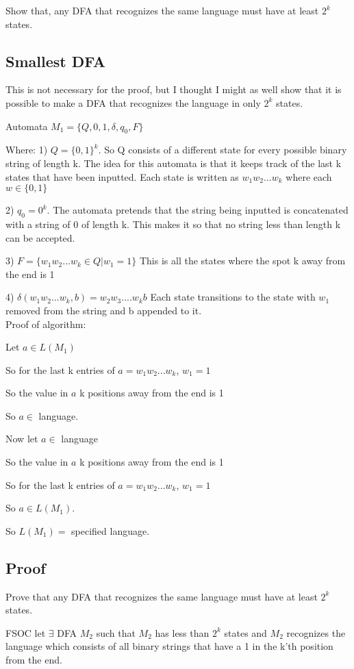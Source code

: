 \documentclass[letterpaper, 11pt]{article}
\begin{document}
Show that, any DFA that recognizes the same language must have at least $2^k$ states.
\subsection*{Smallest DFA}
This is not necessary for the proof, but I thought I might as well show that it is possible to make a DFA that recognizes the language in only $2^k$ states.

Automata $M_1 = \{Q, {0,1}, \delta, q_0, F\}$

Where:
1) $Q = \{0, 1\}^k$. So Q consists of a different state for every possible binary string of length k.
The idea for this automata is that it keeps track of the last k states that have been inputted.
Each state is written as $w_1w_2...w_k$ where each $w \in \{0, 1\}$

2) $q_0 = 0^k$. The automata pretends that the string being inputted is concatenated with a string of 0 of length k. This makes it so that no string less than length k can be accepted.

3) $F = \{w_1w_2...w_k \in Q | w_1 = 1\}$ This is all the states where the spot k away from the end is 1

4) $\delta(w_1w_2...w_k, b) = w_2w_3....w_kb$ Each state transitions to the state with $w_1$ removed from the string and b appended to it.\\

Proof of algorithm:

Let $a \in L(M_1)$

So for the last k entries of $a = w_1w_2...w_k$, $w_1 = 1$

So the value in $a$ k positions away from the end is 1

So $a \in$ language.

Now let $a \in$ language

So the value in $a$ k positions away from the end is 1

So for the last k entries of $a = w_1w_2...w_k$, $w_1 = 1$

So $a \in L(M_1)$.

So $L(M_1) =$ specified language.

\subsection*{Proof}
Prove that any DFA that recognizes the same language must have at least $2^k$ states.

FSOC let $\exists$ DFA $M_2$ such that $M_2$ has less than $2^k$ states and $M_2$ recognizes the language which consists of all binary strings that have a 1 in the k’th position from the end.
\end{document}
